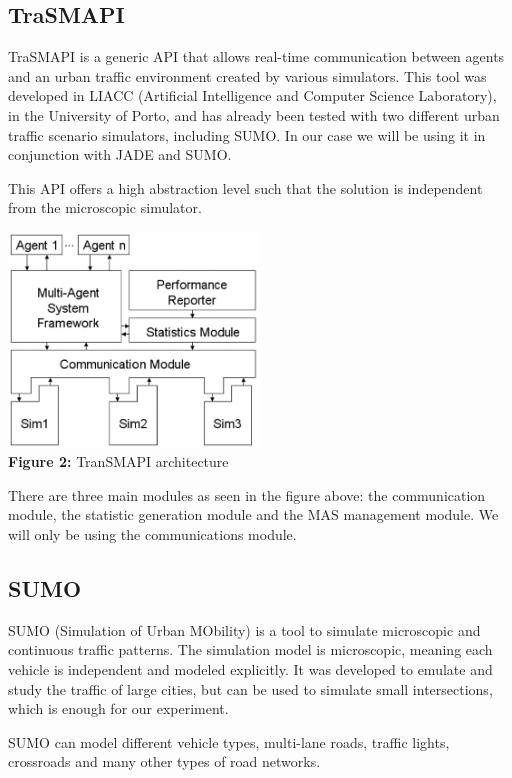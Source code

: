 \documentclass[10pt,a4paper]{article}
\begin{document}
\subsection{TraSMAPI}
	TraSMAPI is a generic API that allows real-time communication between agents and an urban traffic environment created by various simulators. This tool was developed in LIACC (Artificial Intelligence and Computer Science Laboratory), in the University of Porto, and has already been tested with two different urban traffic scenario simulators, including SUMO. In our case we will be using it in conjunction with JADE and SUMO.
	
    This API offers a high abstraction level such that the solution is independent from the microscopic simulator.
    
\begin{center}
    \includegraphics[width=0.5\textwidth]{trasmapi.PNG} \\
    \textbf{Figure 2:} TranSMAPI architecture
\end{center}
    
    There are three main modules as seen in the figure above: the communication module, the statistic generation module and the MAS management module. We will only be using the communications module.

\subsection{SUMO}
	SUMO (Simulation of Urban MObility) is a tool to simulate microscopic and continuous traffic patterns. The simulation model is microscopic, meaning each vehicle is independent and modeled explicitly. It was developed to emulate and study the traffic of large cities, but can be used to simulate small intersections, which is enough for our experiment. 
    
    SUMO can model different vehicle types, multi-lane roads, traffic lights, crossroads and many other types of road networks. 
    
\end{document}
